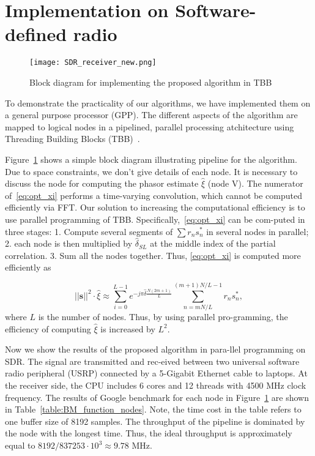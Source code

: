 \section{Implementation on Software-defined radio}
\label{sec:implementation_on_SDR}

\begin{figure}[t]
    \centerline{\texttt{[image: SDR\_receiver\_new.png]}}
    \caption{Block diagram for implementing the proposed algorithm in TBB}
    \label{fig:SDR_receiver}
    \end{figure}

To demonstrate the practicality of our algorithms, we have implemented them on a general
purpose processor (GPP). The different aspects of the algorithm are mapped to logical nodes in a pipelined, parallel processing atchitecture
using Threading Building Blocks (TBB)~\cite{Michael_19}.

Figure~\ref{fig:SDR_receiver} shows a simple block diagram illustrating pipeline for the algorithm.
Due to space constraints, we don't give details of each node. It is necessary to discuss
the node for computing the phasor estimate $\hat{\xi}$ (node V). The numerator of~\eqref{eq:opt_xi}
performs a time-varying convolution, which cannot be computed efficiently via FFT.
Our solution to increasing the computational efficiency is to use parallel programming 
of TBB. Specifically,~\eqref{eq:opt_xi} can be com-puted in three stages:
1. Compute several segments of $\sum r_ns_n^*$ in several nodes in parallel;
2. each node is then multiplied by $\hat{\delta}_{SL}$ at the middle index of the 
partial correlation.
3. Sum all the nodes together.
Thus, \eqref{eq:opt_xi} is computed more efficiently as

\begin{equation}
    \label{eq:refined_opt_S}
    ||\bm{s}||^2\cdot\hat{\xi} \approx \sum_{i=0}^{L-1} e^{-j\pi \hat{\delta}\frac{N(2m+1)}{L}}
    \sum_{n=mN/L}^{(m+1)N/L-1}r_ns_n^*,
  \end{equation}
where $L$ is the number of nodes. Thus, by using parallel pro-gramming,
the efficiency of computing $\hat{\xi}$ is increased by $L^2$.

Now we show the results of the proposed algorithm in para-llel programming on SDR.
The signal are transmitted and rec-eived between two universal software radio peripheral (USRP)
connected by a 5-Gigabit Ethernet cable to laptops. At the receiver side, 
the CPU includes 6 cores and 12 threads with 4500 MHz clock frequency. The results of 
Google benchmark for each node in Figure~\ref{fig:SDR_receiver}
are shown in Table~\ref{table:BM_function_nodes}. Note, the time cost in the table
refers to one buffer size of 8192 samples. The throughput of the 
pipeline is dominated by the node with the longest time. Thus, the ideal throughput is approximately equal to
$8192/837253 \cdot 10^3 \approx 9.78$ MHz.

